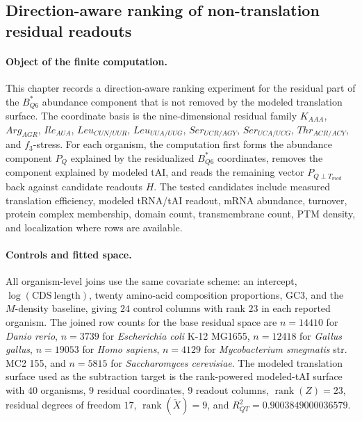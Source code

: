 
\subsection{Direction-aware ranking of non-translation residual readouts}
\label{sec:bioreality-h-candidate-ranking-b-star-q6-non-translation-residual}

\paragraph{Object of the finite computation.}
This chapter records a direction-aware ranking experiment for the residual part of the $B^*_{Q6}$ abundance component that is not removed by the modeled translation surface.  The coordinate basis is the nine-dimensional residual family
$K_{AAA}$, $Arg_{AGR}$, $Ile_{AUA}$, $Leu_{CUN/UUR}$, $Leu_{UUA/UUG}$, $Ser_{UCR/AGY}$, $Ser_{UCA/UCG}$, $Thr_{ACR/ACY}$, and $f_3$-stress.  For each organism, the computation first forms the abundance component $P_Q$ explained by the residualized $B^*_{Q6}$ coordinates, removes the component explained by modeled tAI, and reads the remaining vector $P_{Q\perp T_{mod}}$ back against candidate readouts $H$.  The tested candidates include measured translation efficiency, modeled tRNA/tAI readout, mRNA abundance, turnover, protein complex membership, domain count, transmembrane count, PTM density, and localization where rows are available.

\paragraph{Controls and fitted space.}
All organism-level joins use the same covariate scheme: an intercept, $\log(\mathrm{CDS\ length})$, twenty amino-acid composition proportions, GC3, and the $M$-density baseline, giving $24$ control columns with rank $23$ in each reported organism.  The joined row counts for the base residual space are $n=14410$ for \emph{Danio rerio}, $n=3739$ for \emph{Escherichia coli} K-12 MG1655, $n=12418$ for \emph{Gallus gallus}, $n=19053$ for \emph{Homo sapiens}, $n=4129$ for \emph{Mycobacterium smegmatis} str. MC2 155, and $n=5815$ for \emph{Saccharomyces cerevisiae}.  The modeled translation surface used as the subtraction target is the rank-powered modeled-tAI surface with $40$ organisms, $9$ residual coordinates, $9$ readout columns, $\operatorname{rank}(Z)=23$, residual degrees of freedom $17$, $\operatorname{rank}(\widetilde X)=9$, and $R^2_{QT}=0.9003849000036579$.

